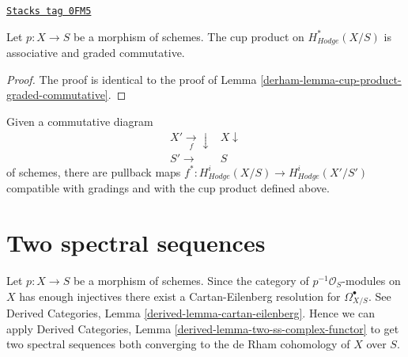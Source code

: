 \begin{lemma}
\label{derham-lemma-cup-product-hodge-graded-commutative}
\href{https://stacks.math.columbia.edu/tag/0FM5}{\texttt{Stacks tag 0FM5}}

Let $p : X \to S$ be a morphism of schemes.
The cup product on $H^*_{Hodge}(X/S)$ is associative and graded commutative.
\end{lemma}

\begin{proof}

The proof is identical to the proof of
Lemma \ref{derham-lemma-cup-product-graded-commutative}.
\end{proof}

Given a commutative diagram
$$
\begin{array}{cc}X' \underset{f}{\longrightarrow}\downarrow & X \downarrow \\ S' \longrightarrow & S\end{array}
$$
of schemes, there are pullback maps
$f^* : H^i_{Hodge}(X/S) \longrightarrow H^i_{Hodge}(X'/S')$
compatible with gradings and with the cup product defined above.

\section{Two spectral sequences}
\label{derham-section-hodge-to-de-rham}
Let $p : X \to S$ be a morphism of schemes. Since the category
of $p^{-1}\mathcal{O}_S$-modules on $X$ has enough injectives
there exist a Cartan-Eilenberg resolution for $\Omega^\bullet_{X/S}$.
See Derived Categories, Lemma \ref{derived-lemma-cartan-eilenberg}.
Hence we can apply Derived Categories, Lemma
\ref{derived-lemma-two-ss-complex-functor} to get two spectral sequences
both converging to the de Rham cohomology of $X$ over $S$.

